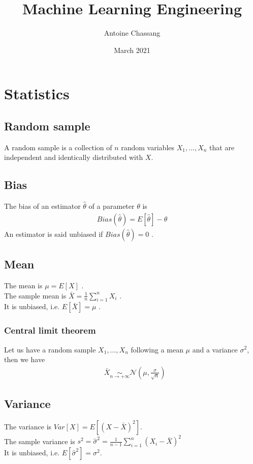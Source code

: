 \documentclass{report}
\title{Machine Learning Engineering}
\author{Antoine Chassang}
\date{March 2021}
\begin{document}
\maketitle
\tableofcontents{}

\chapter{Statistics}
\section{Random sample}
A random sample is a collection of $n$ random variables $X_1,\dots, X_n$ that are independent and
identically distributed with $X$.

\section{Bias}
The bias of an estimator $\hat{\theta}$ of a parameter $\theta$ is
\begin{align*}
    Bias(\hat{\theta}) = E[\hat{\theta}] - \theta
\end{align*}
An estimator is said unbiased if $Bias(\hat{\theta}) = 0$ .

\section{Mean}
The mean is $\mu = E[X]$ . \\
The sample mean is $\bar{X} = \frac{1}{n} \sum_{i=1}^{n}{X_i}$ . \\
It is unbiased, i.e. $E[\bar{X}] = \mu$ .
\subsection{Central limit theorem}
Let us have a random sample $X_1,\dots, X_n$ following a mean $\mu$ and a variance $\sigma^2$, then we have
\begin{align*}
    &\bar{X} \underset{n \to +\infty}{\sim} \mathcal{N}(\mu, \frac{\sigma}{\sqrt{n}})
\end{align*}

\section{Variance}
The variance is $Var[X] = E[(X - \bar{X})^2]$. \\
The sample variance is $s^2 = \hat{\sigma}^2 = \frac{1}{n-1} \sum_{i=1}^{n}{(X_i - \bar{X})^2}$ \\
It is unbiased, i.e. $E[\hat{\sigma}^2] = \sigma^2$.
\end{document}
